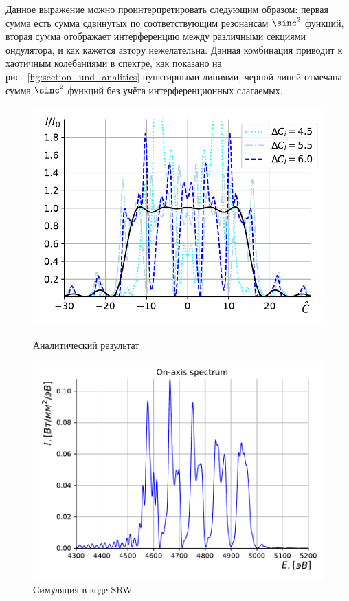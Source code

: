 Данное выражение можно проинтерпретировать следующим образом: первая сумма есть сумма сдвинутых по соответствующим резонансам $\sinc^2$ функций, вторая сумма отображает интерференцию между различными секциями ондулятора, и как кажется автору нежелательна. Данная комбинация приводит к хаотичным колебаниями в спектре, как показано на рис.~\ref{fig:section_und_analitics} пунктирными линиями, черной линей отмечана сумма $\sinc^2$ функций без учёта интерференционных слагаемых.
\begin{figure}
	\centering  
	\begin{minipage}{0.49\textwidth}
		\centering
		\includegraphics[width=\textwidth]{pic/spec_from_sec_und.pdf}
		\caption{Аналитический результат}
		\label{fig:section_und_analitics}
	\end{minipage}\hfill
	\begin{minipage}{0.49\textwidth}
		\centering
		\includegraphics[width=\textwidth]{pic/sim_und_spec.pdf}
		\caption{Симуляция в коде SRW}
		\label{fig:section_und_SRW}
	\end{minipage}    
\end{figure}
